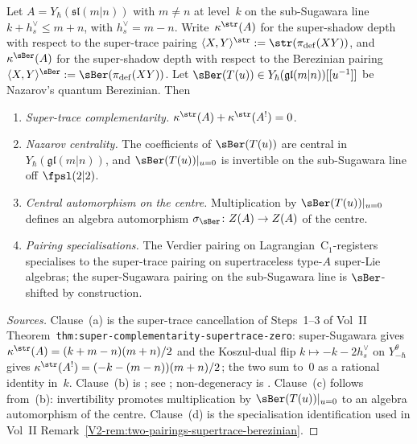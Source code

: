 \begin{proposition}
\label{prop:super-berezinian-central-automorphism}
\ClaimStatusProvedElsewhere
Let $A = Y_\hbar(\mathfrak{sl}(m|n))$ with $m\neq n$ at level~$k$ on
the sub-Sugawara line $k + h^{\vee}_{s} \leq m+n$, with
$h^{\vee}_{s} = m-n$. Write~$\kappa^{\str}(A)$ for the
super-shadow depth with respect to the super-trace pairing
$\langle X, Y\rangle^{\str} := \str(\pi_{\mathrm{def}}(XY))$,
and~$\kappa^{\sBer}(A)$ for the super-shadow depth with respect
to the Berezinian pairing
$\langle X, Y\rangle^{\sBer} := \sBer(\pi_{\mathrm{def}}(XY))$.
Let $\sBer(T(u)) \in Y_\hbar(\mathfrak{gl}(m|n))[[u^{-1}]]$ be
Nazarov's quantum Berezinian. Then
\begin{enumerate}[label=\textup{(\alph*)}]
\item \emph{Super-trace complementarity.}
 $\kappa^{\str}(A) + \kappa^{\str}(A^{!}) = 0$.
\item \emph{Nazarov centrality.}
 The coefficients of $\sBer(T(u))$ are central in
 $Y_\hbar(\mathfrak{gl}(m|n))$, and $\sBer(T(u))|_{u=0}$ is
 invertible on the sub-Sugawara line off $\fpsl(2|2)$.
\item \emph{Central automorphism on the centre.}
 Multiplication by $\sBer(T(u))|_{u=0}$ defines an algebra
 automorphism
 $\sigma_{\sBer}\colon Z(A) \to Z(A)$ of the centre.
\item \emph{Pairing specialisations.}
 The Verdier pairing on Lagrangian~C$_1$-registers specialises to
 the super-trace pairing on supertraceless type-$A$ super-Lie
 algebras; the super-Sugawara pairing on the sub-Sugawara line is
 $\sBer$-shifted by construction.
\end{enumerate}
\end{proposition}
\begin{proof}[Sources]
Clause~(a) is the super-trace cancellation of Steps~1--3 of Vol~II
Theorem~\texttt{thm:super-complementarity-supertrace-zero}: super-Sugawara
gives $\kappa^{\str}(A) = (k+m-n)(m+n)/2$ and the Koszul-dual
flip $k \mapsto -k - 2h^{\vee}_{s}$ on $Y_{-\hbar}^{\theta}$ gives
$\kappa^{\str}(A^{!}) = (-k-(m-n))(m+n)/2$; the two
sum to~$0$ as a rational identity in~$k$. Clause~(b) is
\cite[Thm~1]{Nazarov91QuantumBerezinian}; see
\cite[Ch.~3.9, Thm~3.9.1]{molev-yangians}; non-degeneracy is
\cite[Prop~4.3]{Gow06}. Clause~(c) follows from~(b): invertibility
promotes multiplication by $\sBer(T(u))|_{u=0}$ to an algebra
automorphism of the centre. Clause~(d) is the specialisation
identification used in Vol~II
Remark~\ref{V2-rem:two-pairings-supertrace-berezinian}.
\end{proof}

